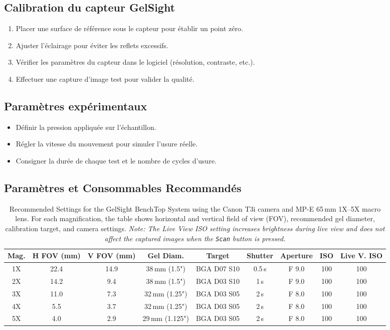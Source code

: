 \documentclass[a4paper,12pt]{article}
\begin{document}
\subsection{Calibration du capteur GelSight}
\begin{enumerate}
    \item Placer une surface de référence sous le capteur pour établir un point zéro.
    \item Ajuster l'éclairage pour éviter les reflets excessifs.
    \item Vérifier les paramètres du capteur dans le logiciel (résolution, contraste, etc.).
    \item Effectuer une capture d’image test pour valider la qualité.
\end{enumerate}

\subsection{Paramètres expérimentaux}
\begin{itemize}
    \item Définir la pression appliquée sur l’échantillon.
    \item Régler la vitesse du mouvement pour simuler l’usure réelle.
    \item Consigner la durée de chaque test et le nombre de cycles d’usure.
\end{itemize}

\subsection{Paramètres et Consommables Recommandés}

\begin{table}[h]
\centering
\caption{Recommended Settings for the GelSight BenchTop System using the Canon T3i camera and MP-E 65\,mm 1X--5X macro lens. 
For each magnification, the table shows horizontal and vertical field of view (FOV), recommended gel diameter, calibration target, and camera settings. 
\textit{Note: The Live View ISO setting increases brightness during live view and does not affect the captured images when the \texttt{Scan} button is pressed.}}
\label{tab:rec-settings}
\begin{tabular}{ccccccccc}
\hline
\textbf{Mag.} & \textbf{H FOV (mm)} & \textbf{V FOV (mm)} & \textbf{Gel Diam.} & \textbf{Target} & \textbf{Shutter} & \textbf{Aperture} & \textbf{ISO} & \textbf{Live V. ISO} \\
\hline
1X & 22.4 & 14.9 & 38\,mm (1.5")   & BGA D07 S10 & 0.5\,s & F 9.0 & 100 & 100 \\
2X & 14.2 & 9.4  & 38\,mm (1.5")   & BGA D03 S10 & 1\,s   & F 9.0 & 100 & 100 \\
3X & 11.0 & 7.3  & 32\,mm (1.25")  & BGA D03 S05 & 2\,s   & F 8.0 & 100 & 100 \\
4X & 5.5  & 3.7  & 32\,mm (1.25")  & BGA D03 S05 & 2\,s   & F 8.0 & 100 & 100 \\
5X & 4.0  & 2.9  & 29\,mm (1.125") & BGA D03 S05 & 2\,s   & F 8.0 & 100 & 100 \\
\hline
\end{tabular}
\end{table}
\end{document}
